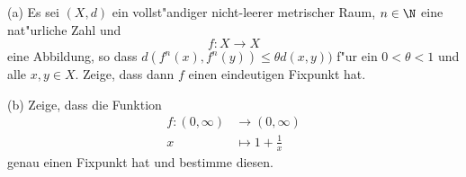 \begin{prob}
(a) Es sei $(X,d)$ ein vollst"andiger nicht-leerer metrischer Raum, $n\in\N$ eine nat"urliche Zahl und
$$f:X\to X$$
eine Abbildung, so dass $d(f^n(x),f^n(y))\leq \theta d(x,y))$ f"ur ein $0<\theta<1$ und alle $x,y\in X$. Zeige, dass dann $f$ einen eindeutigen Fixpunkt hat.

(b) Zeige, dass die Funktion
\begin{equation*}
\begin{split}
f:(0,\infty)&\to(0,\infty)\\
x&\mapsto 1+\frac{1}{x}
\end{split}
\end{equation*}
 genau einen Fixpunkt hat und bestimme diesen.
\end{prob}
